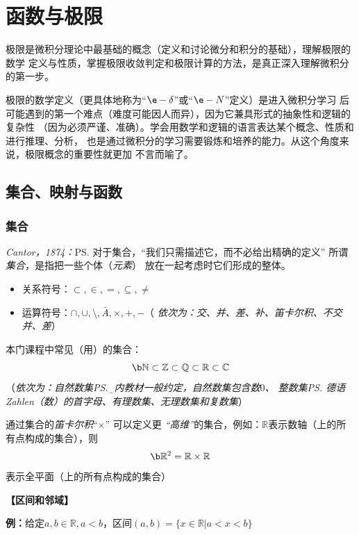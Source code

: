 \chapter{函数与极限}

极限是微积分理论中最基础的概念（定义和讨论微分和积分的基础），理解极限的数学
定义与性质，掌握极限收敛判定和极限计算的方法，是真正深入理解微积分的第一步。

极限的数学定义（更具体地称为“$\e-\delta$”或“$\e-N$”定义）是进入微积分学习
后可能遇到的第一个难点（难度可能因人而异），因为它兼具形式的抽象性和逻辑的复杂性
（因为必须严谨、准确）。学会用数学和逻辑的语言表达某个概念、性质和进行推理、分析，
也是通过微积分的学习需要锻炼和培养的能力。从这个角度来说，极限概念的重要性就更加
不言而喻了。



\section{集合、映射与函数}

\subsection{集合}

{\it Cantor，1874：}\ps{对于集合，“我们只需描述它，而不必给出精确的定义”}
所谓{\it 集合}，是指把一些个体（{\it 元素}） 放在一起考虑时它们形成的整体。
\begin{itemize}
  \setlength{\itemindent}{1cm}
  \item 关系符号：$\subset, \in, =, \subseteq, \neq$
  \item 运算符号：$\cap,\cup, \setminus, \bar{A}, \times, +, - $\quad （{\it
  依次为：交、并、差、补、笛卡尔积、不交并、差}）
\end{itemize}
	
本门课程中常见（用）的集合：
$$\b\mathbb{N}\subset\mathbb{Z}\subset\mathbb{Q}
\subset\mathbb{R}\subset\mathbb{C}$$
\quad（{\it 依次为：自然数集\ps{\b 国内教材一般约定，自然数集包含数$0$}、
整数集\ps{德语Zahlen（数）的首字母}、有理数集、无理数集和复数集}）


通过集合的{\it 笛卡尔积}“$\times$” 可以定义更{\it
“高维”}的集合，例如：$\mathbb{R}$表示数轴（上的所有点构成的集合），则
$${\b \mathbb{R}^2=\mathbb{R}\times\mathbb{R}}$$
表示全平面（上的所有点构成的集合）

{\bf 【区间和邻域】}

{\bf 例：}给定$a,b\in\mathbb{R},a<b$，区间$(a,b)=\{x\in\mathbb{R}|a<x<b\}$

